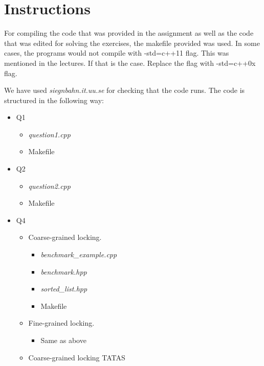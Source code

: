 \section{Instructions}

For compiling the code that was provided in the assignment as well as the 
code that was edited for solving the exercises, the makefile provided was used.
In some cases, the programs would not compile with -std=c++11 flag. This was mentioned
in the lectures. If that is the case. Replace the flag with -std=c++0x flag.

We have used \textit{siegnbahn.it.uu.se} for checking that the code runs.
The code is structured in the following way:

\begin{itemize}
    \item Q1
        \begin{itemize}
            \item \textit{question1.cpp}
            \item Makefile
        \end{itemize}
    \item Q2
        \begin{itemize}
            \item \textit{question2.cpp}
            \item Makefile
        \end{itemize}
    \item Q4
        \begin{itemize}
            \item Coarse-grained locking.
                \begin{itemize}
                    \item \textit{benchmark\_example.cpp}
                    \item \textit{benchmark.hpp}
                    \item \textit{sorted\_list.hpp}
                    \item Makefile
                \end{itemize}
            \item Fine-grained locking.
                \begin{itemize}
                    \item Same as above
                \end{itemize}
            \item Coarse-grained locking TATAS
                \begin{itemize}

\end{itemize}
\end{itemize}
\end{itemize}
